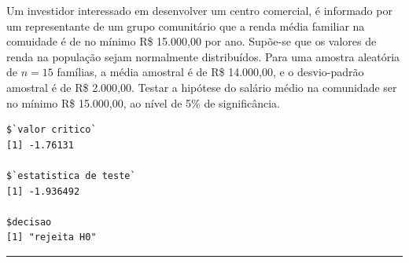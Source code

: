 \documentclass[a4paper,11pt,fleqn]{article}\usepackage[]{graphicx}\usepackage[]{color}
\makeatletter
\newenvironment{kframe}{%
 \def\at@end@of@kframe{}%
 \ifinner\ifhmode%
  \def\at@end@of@kframe{\end{minipage}}%
  \begin{minipage}{\columnwidth}%
 \fi\fi%
 \def\FrameCommand##1{\hskip\@totalleftmargin \hskip-\fboxsep
 \colorbox{shadecolor}{##1}\hskip-\fboxsep
     \hskip-\linewidth \hskip-\@totalleftmargin \hskip\columnwidth}%
 \MakeFramed {\advance\hsize-\width
   \@totalleftmargin\z@ \linewidth\hsize
   \@setminipage}}%
 {\par\unskip\endMakeFramed%
 \at@end@of@kframe}
\newenvironment{knitrout}{}{} %
\theoremstyle{definition}
\makeatother
\begin{document}
\begin{compactenum}[17.] %
\item Um investidor interessado em desenvolver um centro comercial, é
  informado por um representante de um grupo comunitário que a renda
  média familiar na comuidade é de no mínimo R\$ 15.000,00 por
  ano. Supõe-se que os valores de renda na população sejam normalmente
  distribuídos. Para uma amostra aleatória de $n=15$ famílias, a média
  amostral é de R\$ 14.000,00, e o desvio-padrão amostral é de R\$
  2.000,00. Testar a hipótese do salário médio na comunidade ser no
  mínimo R\$ 15.000,00, ao nível de 5\% de significância.
\begin{knitrout}\small
{}\color{fgcolor}\begin{kframe}
\begin{verbatim}
$`valor critico`
[1] -1.76131

$`estatistica de teste`
[1] -1.936492

$decisao
[1] "rejeita H0"
\end{verbatim}
\end{kframe}
\end{knitrout}
\end{compactenum}

\vspace{0.3cm}
\hrule
\vspace{0.3cm}
\end{document}

